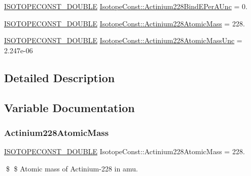 \begin{DoxyCompactItemize}
\mbox{\hyperlink{group___isotope_const-_macros_ga8f45a7272ce02c0b4c65c44636ed719a}{I\+S\+O\+T\+O\+P\+E\+C\+O\+N\+S\+T\+\_\+\+D\+O\+U\+B\+LE}} \mbox{\hyperlink{group___isotope_const-_actinium-_ac228_ga620661e9c605adc813229b7bd9bd5c71}{Isotope\+Const\+::\+Actinium228\+Bind\+E\+Per\+A\+Unc}} = 0.
\item 
\mbox{\hyperlink{group___isotope_const-_macros_ga8f45a7272ce02c0b4c65c44636ed719a}{I\+S\+O\+T\+O\+P\+E\+C\+O\+N\+S\+T\+\_\+\+D\+O\+U\+B\+LE}} \mbox{\hyperlink{group___isotope_const-_actinium-_ac228_gaf951d15f1d379a931af3921846968ab3}{Isotope\+Const\+::\+Actinium228\+Atomic\+Mass}} = 228.
\item 
\mbox{\hyperlink{group___isotope_const-_macros_ga8f45a7272ce02c0b4c65c44636ed719a}{I\+S\+O\+T\+O\+P\+E\+C\+O\+N\+S\+T\+\_\+\+D\+O\+U\+B\+LE}} \mbox{\hyperlink{group___isotope_const-_actinium-_ac228_ga7bf826aa2c4f5be2dc73bc582bb40ab8}{Isotope\+Const\+::\+Actinium228\+Atomic\+Mass\+Unc}} = 2.\+247e-\/06
\end{DoxyCompactItemize}


\subsection{Detailed Description}


\subsection{Variable Documentation}
\mbox{\label{group___isotope_const-_actinium-_ac228_gaf951d15f1d379a931af3921846968ab3}} 
\subsubsection{\texorpdfstring{Actinium228\+Atomic\+Mass}{Actinium228AtomicMass}}
{\footnotesize\ttfamily \mbox{\hyperlink{group___isotope_const-_macros_ga8f45a7272ce02c0b4c65c44636ed719a}{I\+S\+O\+T\+O\+P\+E\+C\+O\+N\+S\+T\+\_\+\+D\+O\+U\+B\+LE}} Isotope\+Const\+::\+Actinium228\+Atomic\+Mass = 228.}

\$ \$ Atomic mass of Actinium-\/228 in amu. \mbox{\label{group___isotope_const-_actinium-_ac228_ga7bf826aa2c4f5be2dc73bc582bb40ab8}} 
